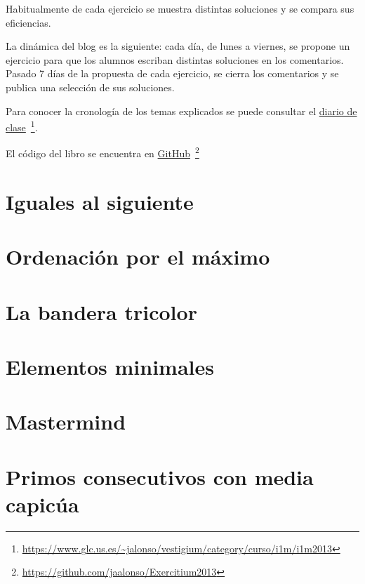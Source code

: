 \documentclass[a4paper,12pt,twoside]{book}
\begin{document}
Habitualmente de cada ejercicio se muestra distintas soluciones y se
compara sus eficiencias.

La dinámica del blog es la siguiente: cada día, de lunes a viernes, se
propone un ejercicio para que los alumnos escriban distintas soluciones
en los comentarios. Pasado 7 días de la propuesta de cada ejercicio, se
cierra los comentarios y se publica una selección de sus soluciones.

Para conocer la cronología de los temas explicados se puede consultar el
\href{https://www.glc.us.es/~jalonso/vestigium/category/curso/i1m/i1m2013}
     {diario de clase}\
     \footnote{\url{https://www.glc.us.es/~jalonso/vestigium/category/curso/i1m/i1m2013}}.

El código del libro se encuentra en
\href{https://github.com/jaalonso/Exercitium2018}
     {GitHub}\
     \footnote{\url{https://github.com/jaalonso/Exercitium2013}}

\chapter{Iguales al siguiente}

\chapter{Ordenación por el máximo}

\chapter{La bandera tricolor}

\chapter{Elementos minimales}

\chapter{Mastermind}

\chapter{Primos consecutivos con media capicúa}
\end{document}
